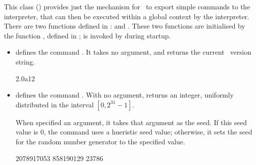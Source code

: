 This class ()
provides just the mechanism for \ns\ to export
simple commands to the interpreter, 
that can then be executed within a global context by the interpreter.
There are two functions defined in :
 and .
These two functions are initialised by the function
,
defined in ;
 is invoked by
during startup.
\begin{itemize}\itemsep0pt
\item {}
  defines the command .
  It takes no argument, and returns the current \ns\ version string.
\begin{program}
            2.0a12
\end{program}

\item {}
  defines the command .
  With no argument,  returns an integer,
  uniformly distributed in the interval $[0, 2^{31}-1]$.

  When specified an argument, it takes that argument as the seed.
  If this seed value is 0, the command uses a hueristic seed value;
  otherwise, it sets the seed for the random number generator to the
  specified value.
\begin{program}
            2078917053
            858190129
            23786
\end{program}
\end{itemize}

